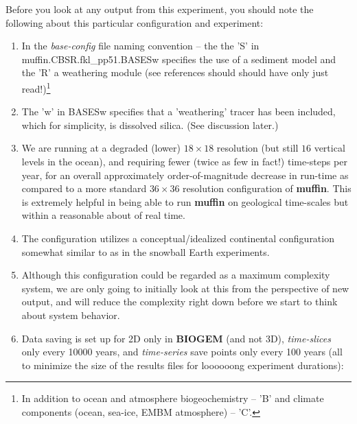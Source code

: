 \newpage

\noindent Before you look at any output from this experiment, you should note the following about this particular configuration and experiment:

\begin{enumerate}[noitemsep]
\vspace{1mm}
\item In the \textit{base-config} file naming convention -- the the '\textsf{\footnotesize S}' in \textsf{\footnotesize muffin.CBSR.fkl\_pp51.BASESw} specifies the use of a sediment model and the '\textsf{\footnotesize R}' a weathering module (see references should should have only just read!)\footnote{In addition to ocean and atmosphere biogeochemistry -- '\textsf{\footnotesize B}' and climate components (ocean, sea-ice, EMBM atmosphere) -- '\textsf{\footnotesize C}'.}
\vspace{1mm}
\item The '\textsf{\footnotesize w}' in \textsf{\footnotesize BASESw} specifies that a 'weathering' tracer has been included, which for simplicity, is dissolved silica. (See discussion later.)
\vspace{1mm}
\item We are running at a degraded (lower) \(18\times18\) resolution (but still \(16\) vertical levels in the ocean), and requiring fewer (twice as few in fact!) time-steps per year, for an overall approximately order-of-magnitude decrease in run-time as compared to a more standard \(36\times36\) resolution configuration of \textbf{muffin}. This is extremely helpful in being able to run \textbf{muffin} on geological time-scales but within a reasonable about of real time.
\vspace{1mm}
\item The configuration utilizes a conceptual/idealized continental configuration somewhat similar to as in the snowball Earth experiments.
\vspace{1mm}
\item Although this configuration could be regarded as a maximum complexity system, we are only going to initially look at this from the perspective of new output, and will reduce the complexity right down before we start to think about system behavior.
\vspace{1mm}
\item Data saving is set up for 2D only in \textbf{BIOGEM} (and not 3D), \textit{time-slices} only every 10000 years, and \textit{time-series} save points only every 100 years (all to minimize the size of the results files for loooooong experiment durations):

\end{enumerate}
